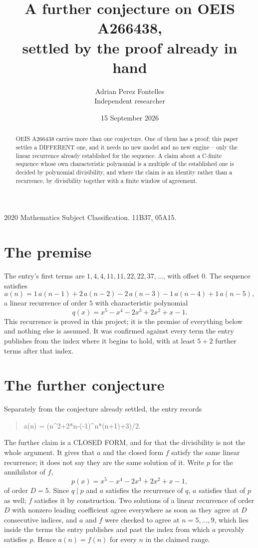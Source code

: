\documentclass[11pt,a4paper]{article}
\title{A further conjecture on OEIS A266438,\\ \large settled by the proof already in hand}
\author{Adrian Perez Fontelles\\ \small Independent researcher}
\date{15 September 2026}
\theoremstyle{plain}
\theoremstyle{definition}
\begin{document}
\maketitle

\begin{abstract}
OEIS A266438 carries more than one conjecture. One of them has a proof; this paper settles a
DIFFERENT one, and it needs no new model and no new engine -- only the linear recurrence already
established for the sequence. A claim about a C-finite sequence whose own characteristic
polynomial is a multiple of the established one is decided by polynomial divisibility, and where
the claim is an identity rather than a recurrence, by divisibility together with a finite window
of agreement.
\end{abstract}

\noindent\small 2020 Mathematics Subject Classification. 11B37, 05A15.\normalsize

\section{The premise}

The entry's first terms are $1, 4, 4, 11, 11, 22, 22, 37,\dots$, with offset $0$. The sequence satisfies
\[
  a(n)=1\,a(n-1) + 2\,a(n-2) - 2\,a(n-3) - 1\,a(n-4) + 1\,a(n-5) ,
\]
a linear recurrence of order $5$ with characteristic polynomial
\[
  q(x)=x^{5} - x^{4} - 2 x^{3} + 2 x^{2} + x - 1 .
\]
This recurrence is proved in this project; it is the premise of everything below and nothing else is assumed.
It was confirmed against every term the entry publishes from the index where it begins to hold,
with at least $5+2$ further terms after that index.

\section{The further conjecture}

Separately from the conjecture already settled, the entry records

\begin{quote}\raggedright a(n) = (n\^{}2+2*n-(-1)\^{}n*(n+1)+3)/2.\end{quote}

The further claim is a CLOSED FORM, and for that the divisibility is not the whole argument. It
gives that $a$ and the closed form $f$ satisfy the same linear recurrence; it does not say they
are the same solution of it. Write $p$ for the annihilator of $f$,
\[
  p(x)=x^{5} - x^{4} - 2 x^{3} + 2 x^{2} + x - 1 ,
\]
of order $D=5$. Since $q\mid p$ and $a$ satisfies the recurrence of $q$, $a$ satisfies that of
$p$ as well; $f$ satisfies it by construction. Two solutions of a linear recurrence of order $D$
with nonzero leading coefficient agree everywhere as soon as they agree at $D$ consecutive
indices, and $a$ and $f$ were checked to agree at $n=5,\dots,9$,
which lies inside the terms the entry publishes and past the index from which $a$ provably
satisfies $p$. Hence $a(n)=f(n)$ for every $n$ in the claimed range.
\end{document}
